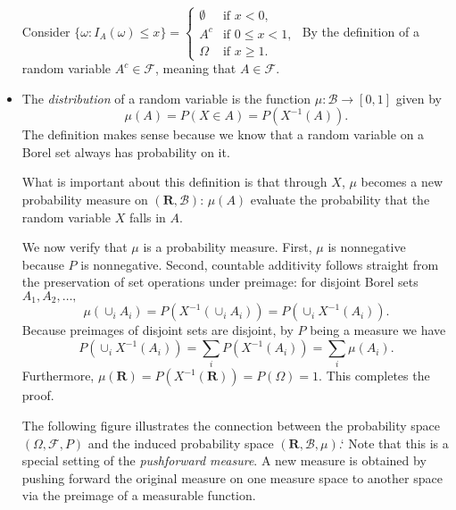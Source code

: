 \documentclass[11pt]{article}
\newcommand{\df}[1]{\textit{\textsf{#1}}} %
\newcommand{\R}{\mathbf{R}}
\newcommand{\B}{\mathcal{B}} %
\newcommand{\F}{\mathcal{F}} %
\begin{document}
\begin{itemize}
    Consider $\{\omega : I_A(\omega) \leq x\} = 
    \begin{cases}
        \emptyset & \text{if } x < 0, \\
        A^c & \text{if } 0 \leq x < 1, \\
        \Omega & \text{if } x \geq 1.
    \end{cases}$ By the definition of a random variable $A^c \in \F$, meaning that $A \in \F$.
    \item The \df{distribution} of a random variable is the function $\mu: \B \to [0,1]$ given by \[\mu(A) = P(X \in A) = P(X^{-1}(A)).\]
    The definition makes sense because we know that a random variable on a Borel set always has probability on it.

    What is important about this definition is that through $X$, $\mu$ becomes a new probability measure on $(\R, \B)$: $\mu(A)$ evaluate the probability that the random variable $X$ falls in $A$.

    We now verify that $\mu$ is a probability measure. First, $\mu$ is nonnegative because $P$ is nonnegative. Second, countable additivity follows straight from the preservation of set operations under preimage: for disjoint Borel sets $A_1,A_2,\dots,$ \[\mu(\cup_i A_i) = P(X^{-1}(\cup_i A_i)) = P(\cup_i X^{-1}(A_i)).\] Because preimages of disjoint sets are disjoint, by $P$ being a measure we have \[\textstyle P(\cup_i X^{-1}(A_i)) = \sum_i P(X^{-1}(A_i)) = \sum_i \mu(A_i).\] Furthermore, $\mu(\R) = P(X^{-1}(\R)) = P(\Omega) = 1$. This completes the proof.
    
    The following figure illustrates the connection between the probability space $(\Omega,\F,P)$ and the induced probability space $(\R,\B,\mu)$.`
    Note that this is a special setting of the \df{pushforward measure}. A new measure is obtained by pushing forward the original measure on one measure space to another space via the preimage of a measurable function.
\end{itemize}
\end{document}
